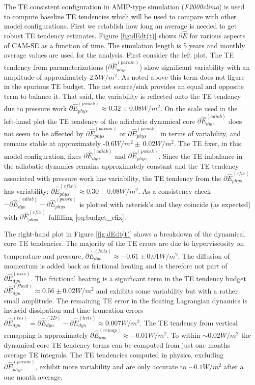 \documentclass{agujournal}
\newcommand*{\gi}[1]{\widehat{#1}}
\begin{document}
The TE consistent configuration in AMIP-type simulation ({\em{F2000climo}}) is used to compute baseline TE tendencies which will be used to compare with other model configurations. First we establish how long an average is needed to get robust TE tendency estimates. Figure \ref{fig:dEdt(t)} shows $\partial \gi{E}$ for various aspects of CAM-SE as a function of time. The simulation length is 5 years and monthly average values are used for the analysis. First consider the left plot. The TE tendency from parameterizations ($\partial \gi{E}^{(param)}_{phys}$) show significant variability with an amplitude of approximately 2.5$W/m^2$. As noted above this term does not figure in the spurious TE budget. The net source/sink provides an equal and opposite term to balance it. That said, the variability is reflected onto the TE tendency due to pressure work $\partial \gi{E}^{(pwork)}_{phys}\approx 0.32\pm 0.08 W/m^2$. On the scale used in the left-hand plot the TE tendency of the adiabatic dynamical core $\partial \gi{E}^{(adiab)}_{dyn}$ does not seem to be affected by $\partial \gi{E}^{(param)}_{phys}$ or $\partial \gi{E}^{(pwork)}_{phys}$ in terms of variability, and remains stable at approximately -0.6$W/m^2\pm ~0.02 W/m^2$. The TE fixer, in this model configuration, fixes $\partial \gi{E}^{(adiab)}_{dyn}$ and $\partial \gi{E}^{(pwork)}_{phys}$. Since the TE imbalance in the adiabatic dynamics remains approximately constant and the TE tendency associated with pressure work has variability, the TE tendency from the $\partial \gi{E}^{(efix)}_{phys}$ has variability; $\partial \gi{E}^{(efix)}_{phys}\approx 0.30 \pm 0.08 W/m^2$. As a consistency check $-\partial \gi{E}^{(adiab)}_{dyn}-\partial \gi{E}^{(pwork)}_{phys}$ is plotted with asterisk's and they coincide (as expected) with $\partial \gi{E}^{(efix)}_{phys}$ fulfilling \eqref{eq:budget_efix}.

The right-hand plot in  Figure \ref{fig:dEdt(t)} shows a breakdown of the dynamical core TE tendencies. The majority of the TE errors are due to hyperviscosity on temperature and pressure, $\partial \gi{E}^{(hvis)}_{dyn}\approx -0.61\pm 0.01 W/m^2$. The diffusion of momentum is added back as frictional heating and is therefore not part of $\partial \gi{E}^{(hvis)}_{dyn}$. The frictional heating is a significant term in the TE tendency budget $\partial \gi{E}^{(fheat)}_{dyn}\approx 0.56\pm 0.02 W/m^2$ and exhibits some variability but with a rather small amplitude. The remaining TE error in the floating Lagrangian dynamics is inviscid dissipation and time-truncation errors $\partial \gi{E}_{dyn}^{(res)}=\partial \gi{E}_{dyn}^{({2D})}-\partial \gi{E}_{dyn}^{({hvis})}\approx 0.007 W/m^2$. The TE tendency from vertical remapping is approximately $\partial \gi{E}_{dyn}^{({remap})}\approx -0.01 W/m^2$. To within $\sim 0.02 W/m^2$ the dynamical core TE tendency terms can be computed from just one months average TE integrals. The TE tendencies computed in physics, excluding $\partial \gi{E}^{(param)}_{phys}$, exhibit more variability and are only accurate to $\sim 0.1 W/m^2$ after a one month average.
\end{document}
